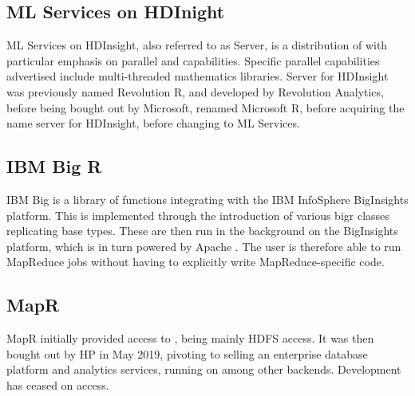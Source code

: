 \hypertarget{sec:r-server-hdinsight}{%
    \subsection{ML Services on HDInight}\label{sec:r-server-hdinsight}}

ML Services on HDInsight, also referred to as \R Server, is a
distribution of \R with particular emphasis on parallel and
capabilities\cite{azure16:_r_server_hdins_r_analy}. Specific
parallel capabilities advertised include multi-threaded mathematics
libraries. \R Server for HDInsight was previously named Revolution R, and
developed by Revolution Analytics, before being bought out by Microsoft,
renamed Microsoft R, before acquiring the name \R server for HDInsight,
before changing to ML Services.

\hypertarget{sec:ibm-big-r}{%
    \subsection{IBM Big R}\label{sec:ibm-big-r}}

IBM Big \R is a library of functions integrating \R with the IBM
InfoSphere BigInsights platform\cite{inc.14:_infos_bigin_big_r}.
This is implemented through the introduction of various bigr classes
replicating base \R types. These are then run in the background on the
BigInsights platform, which is in turn powered by Apache . The
user is therefore able to run MapReduce jobs without having to
explicitly write MapReduce-specific code.

\hypertarget{sec:mapr}{%
    \subsection{MapR}\label{sec:mapr}}

MapR initially provided \R access to , being mainly HDFS
access\cite{mapr19:_indus_next_gener_data_platf_ai_analy}. It was
then bought out by HP in May 2019, pivoting to selling an enterprise
database platform and analytics services, running on  among other
backends. Development has ceased on \R access.
